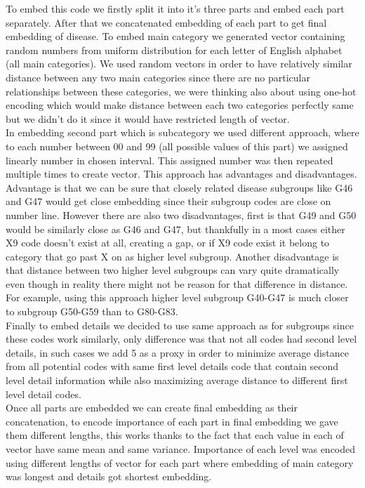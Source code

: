 To embed this code we firstly split it into it's three parts and embed each part separately. After that we concatenated embedding of each part to get final embedding of disease.
To embed main category we generated vector containing random numbers from uniform distribution for each letter of English alphabet (all main categories). We used random vectors in order to have relatively similar distance between any two main categories since there are no particular relationships between these categories, we were thinking also about using one-hot encoding which would make distance between each two categories perfectly same but we didn't do it since it would have restricted length of vector. 
\\

In embedding second part which is subcategory we used different approach, where to each number between 00 and 99 (all possible values of this part) we assigned linearly number in chosen interval. This assigned number was then repeated multiple times to create vector. This approach has advantages and disadvantages. Advantage is that we can be sure that closely related disease subgroups like G46 and G47 would get close embedding since their subgroup codes are close on number line. However there are also two disadvantages, first is that G49 and G50 would be similarly close as G46 and G47, but thankfully in a most cases either X9 code doesn't exist at all, creating a gap, or if X9 code exist it belong to category that go past X on as higher level subgroup. Another disadvantage is that distance between two higher level subgroups can vary quite dramatically even though in reality there might not be reason for that difference in distance. For example, using this approach higher level subgroup G40-G47 is much closer to subgroup G50-G59 than to G80-G83.
\\

Finally to embed details we decided to use same approach as for subgroups since these codes work similarly, only difference was that not all codes had second level details, in such cases we add 5 as a proxy in order to minimize average distance from all potential codes with same first level details code that contain second level detail information while also maximizing average distance to different first level detail codes.
\\

Once all parts are embedded we can create final embedding as their concatenation, to encode importance of each part in final embedding we gave them different lengths, this works thanks to the fact that each value in each of vector have same mean and same variance. 
Importance of each level was encoded using different lengths of vector for each part where embedding of main category was longest and details got shortest embedding.

